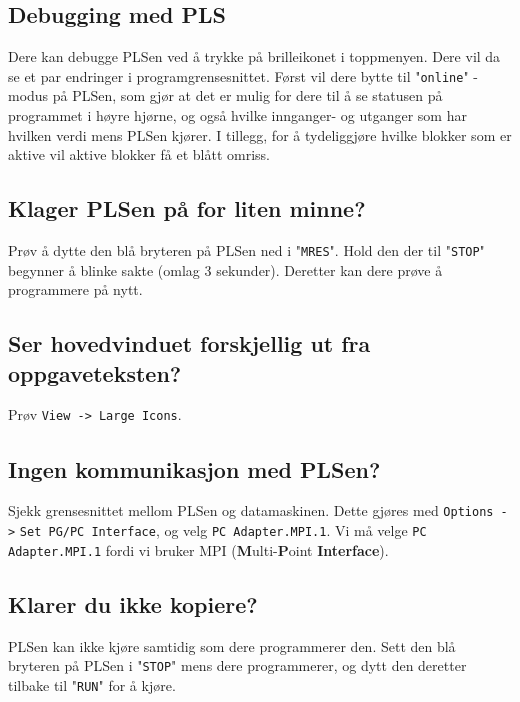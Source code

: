\subsection{Debugging med PLS}
Dere kan debugge PLSen ved å trykke på brilleikonet i toppmenyen. Dere vil da se et par endringer i programgrensesnittet. Først vil dere bytte til "\verb|online|" - modus på PLSen, som gjør at det er mulig for dere til å se statusen på programmet i høyre hjørne, og også hvilke innganger- og utganger som har hvilken verdi mens PLSen kjører. I tillegg, for å tydeliggjøre hvilke blokker som er aktive vil aktive blokker få et blått omriss. 

\subsection{Klager PLSen på for liten minne?}


Prøv å dytte den blå bryteren på PLSen ned i "\verb|MRES|". Hold den der til "\verb|STOP|" begynner å blinke sakte (omlag 3 sekunder). Deretter kan dere prøve å programmere på nytt.


\subsection{Ser hovedvinduet forskjellig ut fra oppgaveteksten?}
Prøv \verb|View -> Large Icons|.

\subsection{Ingen kommunikasjon med PLSen?}
Sjekk grensesnittet mellom PLSen og datamaskinen. Dette gjøres med \verb|Options ->| \verb|Set PG/PC Interface|, og velg \verb|PC Adapter.MPI.1|. Vi må velge \verb|PC Adapter.MPI.1| fordi vi bruker MPI (\textbf{M}ulti-\textbf{P}oint \textbf{Interface}).

\subsection{Klarer du ikke kopiere?}
PLSen kan ikke kjøre samtidig som dere programmerer den. Sett den blå
bryteren på PLSen i "\verb|STOP|" mens dere programmerer, og dytt den deretter
tilbake til "\verb|RUN|" for å kjøre.